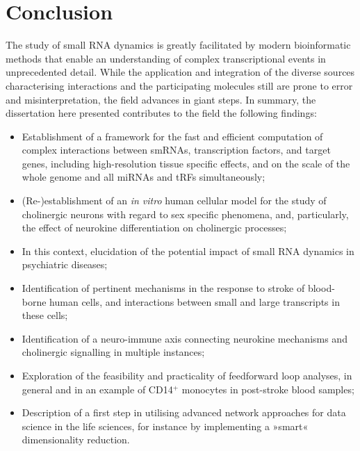\chapter{Conclusion}
\label{conclusion}
The study of small RNA dynamics is greatly facilitated by modern bioinformatic methods that enable an understanding of complex transcriptional events in unprecedented detail. While the application and integration of the diverse sources characterising interactions and the participating molecules still are prone to error and misinterpretation, the field advances in giant steps. In summary, the dissertation here presented contributes to the field the following findings:

\begin{itemize}[noitemsep, leftmargin=.5cm, label={\tiny\raisebox{.5ex}{\textbullet}}]
\item Establishment of a framework for the fast and efficient computation of complex interactions between smRNAs, transcription factors, and target genes, including high-resolution tissue specific effects, and on the scale of the whole genome and all miRNAs and tRFs simultaneously;

\item (Re-)establishment of an \emph{in vitro} human cellular model for the study of cholinergic neurons with regard to sex specific phenomena, and, particularly, the effect of neurokine differentiation on cholinergic processes;

\item In this context, elucidation of the potential impact of small RNA dynamics in psychiatric diseases;

\item Identification of pertinent mechanisms in the response to stroke of blood-borne human cells, and interactions between small and large transcripts in these cells;

\item Identification of a neuro-immune axis connecting neurokine mechanisms and cholinergic signalling in multiple instances;

\item Exploration of the feasibility and practicality of feedforward loop analyses, in general and in an example of CD14$^+$ monocytes in post-stroke blood samples;

\item Description of a first step in utilising advanced network approaches for data science in the life sciences, for instance by implementing a »smart« dimensionality reduction.
\end{itemize}
